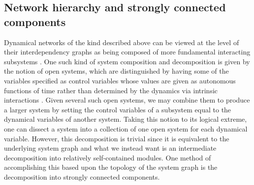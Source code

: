 \subsection{Network hierarchy and strongly connected components}

Dynamical networks of the kind described above can be viewed at the level of their interdependency graphs as being composed of more fundamental interacting subsystems . One such kind of system composition and decomposition is given by the notion of open systems, which are distinguished by having some of the variables specified as control variables whose values are given as autonomous functions of time rather than determined by the dynamics via intrinsic interactions \cite{Vagner2014}.  Given several such open systems, we may combine them to produce a larger system by setting the control variables of a subsystem equal to the dynamical variables of another system.  Taking this notion to its logical extreme, one can dissect a system into a collection of one open system for each dynamical variable.  However, this decomposition is trivial since it is equivalent to the underlying system graph and what we instead want is an intermediate decomposition into relatively self-contained modules.  One method of accomplishing this based upon the topology of the system graph is the decomposition into strongly connected components.

